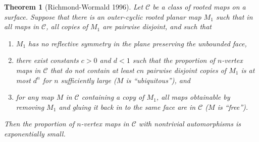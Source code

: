 \documentclass[amsmath,longbibliography,secnumarabic,floatfix,amssymb,nofootinbib,nobibnotes,letterpaper,11pt,tightenlines,notitlepage,showkeys,showlabels]{amsart}%
\newtheorem{theorem}{Theorem}
\theoremstyle{definition}
\begin{document}
\begin{theorem}[Richmond-Wormald 1996]
  Let $\mathscr C$ be a class of rooted maps on a surface. Suppose that there is an outer-cyclic
  rooted planar map $M_1$ such that in all maps in $\mathscr C$, all copies of $M_1$ are pairwise
  disjoint, and such that
  \begin{enumerate}
  \item $M_1$ has no reflective symmetry in the plane preserving the unbounded face,
  \item there exist constants $c > 0$ and $d < 1$ such that the proportion of $n$-vertex maps in
    $\mathscr C$ that do not contain at least $cn$ pairwise disjoint copies of $M_1$ is at most
    $d^n$ for $n$ sufficiently large ($M$ is ``ubiquitous''), and
  \item for any map $M$ in $\mathscr C$ containing a copy of $M_1$, all maps obtainable by removing
    $M_1$ and gluing it back in to the same face are in $\mathscr C$ ($M$ is ``free'').
  \end{enumerate}
  Then the proportion of $n$-vertex maps in $\mathscr C$ with nontrivial automorphisms is
  exponentially small.
\end{theorem}
\end{document}
